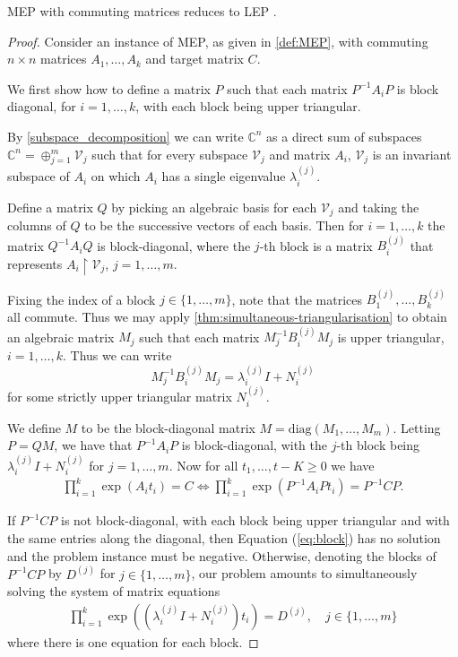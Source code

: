\documentclass[format=acmsmall, review=false, screen=true]{acmart}
\newcommand{\Complex}{\mathbb{C}}
\begin{document}
\begin{proposition}
MEP with commuting matrices reduces to LEP \@.
\label{prop:mep-to-lep}
\end{proposition}

\begin{proof}
  Consider an instance of MEP, as given in \cref{def:MEP},
  with commuting $n\times n$ matrices $A_1,\ldots,A_k$ and target
  matrix $C$.

  We first show how to define a matrix $P$ such that each matrix
  $P^{-1} A_{i} P$ is block diagonal, for $i=1,\ldots,k$, with each block
  being upper triangular.

  By \cref{subspace_decomposition} we can write $\Complex^n$
  as a direct sum of subspaces $\Complex^n = \oplus_{j=1}^m \mathcal{V}_j$
  such that for every subspace $\mathcal{V}_j$ and matrix $A_i$, $\mathcal{V}_j$ is an
  invariant subspace of $A_i$ on which $A_i$ has a single eigenvalue
  $\lambda_i^{(j)}$.

  Define a matrix $Q$ by picking an algebraic basis for each
  $\mathcal{V}_j$ and taking the columns of $Q$ to be the
  successive vectors of each basis.  Then for $i=1,\ldots,k$ the matrix $Q^{-1}
  A_{i} Q$ is block-diagonal, where the $j$-th block is a matrix
  $B^{(j)}_i$ that represents $A_{i} \restriction{\mathcal{V}_j}$,
  $j=1,\ldots,m$.

  Fixing the index of a block $j\in \lbrace 1,\ldots,m \rbrace$, note
  that the matrices $B_1^{(j)},\ldots,B_k^{(j)}$ all commute.  Thus we
  may apply \cref{thm:simultaneous-triangularisation} to obtain an
  algebraic matrix $M_j$ such that each matrix $M_j^{-1} B^{(j)}_{i}
  M_j$ is upper triangular, $i=1,\ldots,k$.  Thus we can write
  \[ M_j^{-1} B^{(j)}_{i} M_j = \lambda_i^{(j)}I + N_i^{(j)} \]
  for some strictly upper triangular matrix $ N_i^{(j)}$.

  We define $M$ to be the block-diagonal matrix
  $M=\mathrm{diag}(M_1,\ldots,M_m)$.  Letting $P=QM$, we have that
  $P^{-1} A_{i} P$ is block-diagonal, with the $j$-th block being
  $\lambda_i^{(j)}I + N_i^{(j)}$ for $j=1,\ldots,m$.  Now for all $t_1,\ldots,t-K\geq 0$ we have
\begin{align}
\prod \limits_{i=1}^{k} \exp \left( A_{i} t_{i} \right) = C \Leftrightarrow \prod \limits_{i=1}^{k} \exp \left( P^{-1}A_{i}P t_{i} \right) = P^{-1}CP .
\label{eq:block}
\end{align}

If $P^{-1}CP$ is not block-diagonal, with each block being upper
triangular and with the same entries along the diagonal, then Equation
(\ref{eq:block}) has no solution and the problem instance must be
negative. Otherwise, denoting the blocks of $P^{-1}CP$ by $D^{(j)}$ for
$j \in \lbrace 1, \ldots, m \rbrace$, our problem amounts to
simultaneously solving the system of matrix equations
\begin{align}
\prod\limits_{i=1}^{k} \exp\left(\left(\lambda_i^{(j)}I + N_i^{(j)}\right)t_{i}\right) = D^{(j)}, \quad j \in \lbrace 1, \ldots, m \rbrace
\label{eq:main1}
\end{align}
where there is one equation for each block.


\end{proof}
\end{document}
